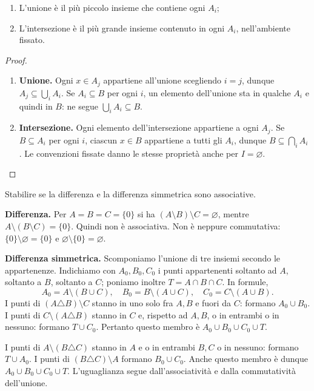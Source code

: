 \begin{proposizione}
\begin{enumerate}[label=\arabic*.]
\item L'unione è il più piccolo insieme che contiene ogni $A_i$;
\item L'intersezione è il più grande insieme contenuto in ogni $A_i$, nell'ambiente fissato.
\end{enumerate}
\end{proposizione}
\begin{proof}
\begin{enumerate}[label=\arabic*.]
\item \textbf{Unione.} Ogni $x\in A_j$ appartiene all'unione scegliendo $i=j$, dunque $A_j\subseteq\bigcup_i A_i$. Se $A_i\subseteq B$ per ogni $i$, un elemento dell'unione sta in qualche $A_i$ e quindi in $B$: ne segue $\bigcup_i A_i\subseteq B$.
\item \textbf{Intersezione.} Ogni elemento dell'intersezione appartiene a ogni $A_j$. Se $B\subseteq A_i$ per ogni $i$, ciascun $x\in B$ appartiene a tutti gli $A_i$, dunque $B\subseteq\bigcap_i A_i$. Le convenzioni fissate danno le stesse proprietà anche per $I=\varnothing$.
\end{enumerate}
\end{proof}

\begin{esercizio}
Stabilire se la differenza e la differenza simmetrica sono associative.
\end{esercizio}
\begin{svolgimento}
\textbf{Differenza.} Per $A=B=C=\{0\}$ si ha $(A\setminus B)\setminus C=\varnothing$, mentre $A\setminus(B\setminus C)=\{0\}$. Quindi non è associativa. Non è neppure commutativa: $\{0\}\setminus\varnothing=\{0\}$ e $\varnothing\setminus\{0\}=\varnothing$.

\textbf{Differenza simmetrica.} Scomponiamo l'unione di tre insiemi secondo le appartenenze. Indichiamo con $A_0,B_0,C_0$ i punti appartenenti soltanto ad $A$, soltanto a $B$, soltanto a $C$; poniamo inoltre $T=A\cap B\cap C$. In formule,
\[
A_0=A\setminus(B\cup C),\quad B_0=B\setminus(A\cup C),\quad C_0=C\setminus(A\cup B).
\]
 I punti di $(A\triangle B)\setminus C$ stanno in uno solo fra $A,B$ e fuori da $C$: formano $A_0\cup B_0$. I punti di $C\setminus(A\triangle B)$ stanno in $C$ e, rispetto ad $A,B$, o in entrambi o in nessuno: formano $T\cup C_0$. Pertanto questo membro è $A_0\cup B_0\cup C_0\cup T$.

 I punti di $A\setminus(B\triangle C)$ stanno in $A$ e o in entrambi $B,C$ o in nessuno: formano $T\cup A_0$. I punti di $(B\triangle C)\setminus A$ formano $B_0\cup C_0$. Anche questo membro è dunque $A_0\cup B_0\cup C_0\cup T$. L'uguaglianza segue dall'associatività e dalla commutatività dell'unione.
\end{svolgimento}

